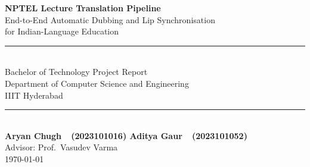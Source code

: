 \documentclass[12pt,a4paper]{article}
\begin{document}
\begin{titlepage}
  \centering
  \vspace*{2cm}
  {\LARGE\bfseries NPTEL Lecture Translation Pipeline\\[0.4em]}
  {\large End-to-End Automatic Dubbing and Lip Synchronisation\\[0.4em]
   for Indian-Language Education\\[2em]}
  \rule{\linewidth}{0.5pt}\\[1em]
  {\large Bachelor of Technology Project Report\\[0.5em]}
  {\normalsize Department of Computer Science and Engineering\\[0.3em]
   IIIT Hyderabad\\[2em]}
  \rule{\linewidth}{0.5pt}\\[1em]
  {\large\bfseries Aryan Chugh\ \ (2023101016) \quad Aditya Gaur\ \ (2023101052)}\\[0.5em]
  {\normalsize Advisor: Prof.\ Vasudev Varma}\\[0.5em]
  {\normalsize\today}\\[3em]
  \begin{abstract}
    \noindent
    This report presents an end-to-end automatic video dubbing pipeline
    designed to translate English NPTEL lecture videos into Hindi,
    Telugu, and Odia — complete with dubbed audio, soft subtitles,
    voice cloning, and lip synchronisation.  The system chains
    seven distinct machine-learning and signal-processing stages:
    audio extraction, music separation (Demucs), speech-to-text
    (faster-Whisper), neural machine translation (GCP Cloud Translate / Gemini),
    text-to-speech (Google Cloud TTS Neural2), tone-colour voice cloning
    (OpenVoice v2), temporal alignment (RubberBand), and facial lip
    synchronisation (Wav2Lip).  Each component was evaluated against
    alternatives; the design decisions and performance trade-offs are
    documented here.  Sample outputs are available at:
    \href{https://drive.google.com/drive/folders/1_JSBJYKzM6jmwpKTSqcICVxC-7uiiQ1k?usp=drive_link}{Google Drive (sample outputs)}.
    The full source code is available at:
    \href{https://github.com/Aditya-Gaur26/multilingual_video_translation}{GitHub (codebase)}.
  \end{abstract}
\end{titlepage}

\tableofcontents
\newpage
\end{document}
